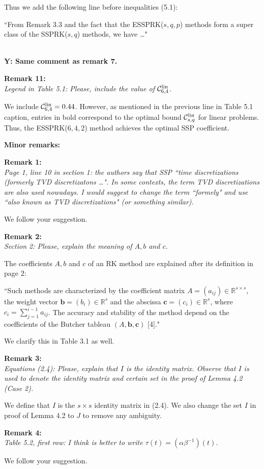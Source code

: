\documentclass[12pt]{article}
\newcommand{\remark}[2]{\vspace{25pt} \noindent \textbf{Remark #1:\newline} \textit{#2}\vspace{15pt}}
\renewcommand{\newline}{\vspace{15pt}\\}
\newcommand{\sspcoef}{\mathcal{C}}
\newcommand{\clin}{\sspcoef^{\textnormal{lin}}_{s,q}}
\newcommand{\yiannis}[1]{\textcolor{OliveGreen}{\\\textbf{Y: \footnotesize #1}\\}}
\begin{document}
Thus we add the following line before inequalities (5.1):

``From Remark 3.3 and the fact that the ESSPRK($s,q,p$) methods 
form a super class of the SSPRK($s,q$) methods, we have \dots"

\yiannis{Same comment as remark 7.}

\remark{11}{
Legend in Table 5.1: Please, include the value of $\sspcoef^{\textnormal{lin}}_{6,4}$.}

We include $\sspcoef^{\textnormal{lin}}_{6,4}=0.44$.
However, as mentioned in the previous line in Table 5.1 caption, entries in bold correspond to 
the optimal bound $\clin$ for linear problems. Thus, the ESSPRK($6,4,2$) method achieves the 
optimal SSP coefficient.
\pagebreak

\noindent \textbf{\large Minor remarks:}

\remark{1}{
Page 1, line 10 in section 1: the authors say that SSP ``time discretizations (formerly
TVD discretizatons \dots". 
In some contexts, the term TVD discretizations are also used nowadays. 
I would suggest to change the term ``formely" and use ``also known as TVD discretizations" 
(or something similar).}

We follow your suggestion.

\remark{2}{
Section 2: Please, explain the meaning of $A, b$ and $c$.}

The coefficients $A, b$ and $c$ of an RK method are explained after its definition in page 2:

``Such methods are characterized by the coefficient matrix $A = (a_{ij}) \in 
\mathbb{R}^{s \times s}$, the weight vector $\bm{b} = (b_i) \in \mathbb{R}^s$
and the abscissa $\bm{c} = (c_i) \in \mathbb{R}^s$, where 
$c_i = \sum_{j=1}^{i-1}a_{ij}$.
The accuracy and stability of the method depend on the coefficients of the 
Butcher tableau $(A,\bm{b},\bm{c})$ [4]."

We clarify this in Table 3.1 as well.

\remark{3}{
Equations (2.4): Please, explain that $I$ is the identity matrix. Observe that $I$ is used to
denote the identity matrix and certain set in the proof of Lemma 4.2 (Case 2).}

We define that $I$ is the $s \times s$ identity matrix in (2.4).
We also change the set $I$ in proof of Lemma 4.2 to $J$ to remove any ambiguity.

\remark{4}{
Table 5.2, first row: I think is better to write $\tau(t) = (\alpha\beta^{-1})(t)$.}

We follow your suggestion.
\end{document}
